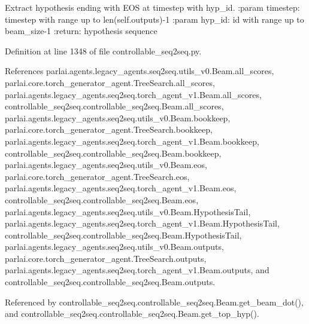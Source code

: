 \begin{DoxyVerb}Extract hypothesis ending with EOS at timestep with hyp_id.
:param timestep:
    timestep with range up to len(self.outputs)-1
:param hyp_id:
    id with range up to beam_size-1
:return:
    hypothesis sequence
\end{DoxyVerb}
 

Definition at line 1348 of file controllable\+\_\+seq2seq.\+py.



References parlai.\+agents.\+legacy\+\_\+agents.\+seq2seq.\+utils\+\_\+v0.\+Beam.\+all\+\_\+scores, parlai.\+core.\+torch\+\_\+generator\+\_\+agent.\+Tree\+Search.\+all\+\_\+scores, parlai.\+agents.\+legacy\+\_\+agents.\+seq2seq.\+torch\+\_\+agent\+\_\+v1.\+Beam.\+all\+\_\+scores, controllable\+\_\+seq2seq.\+controllable\+\_\+seq2seq.\+Beam.\+all\+\_\+scores, parlai.\+agents.\+legacy\+\_\+agents.\+seq2seq.\+utils\+\_\+v0.\+Beam.\+bookkeep, parlai.\+core.\+torch\+\_\+generator\+\_\+agent.\+Tree\+Search.\+bookkeep, parlai.\+agents.\+legacy\+\_\+agents.\+seq2seq.\+torch\+\_\+agent\+\_\+v1.\+Beam.\+bookkeep, controllable\+\_\+seq2seq.\+controllable\+\_\+seq2seq.\+Beam.\+bookkeep, parlai.\+agents.\+legacy\+\_\+agents.\+seq2seq.\+utils\+\_\+v0.\+Beam.\+eos, parlai.\+core.\+torch\+\_\+generator\+\_\+agent.\+Tree\+Search.\+eos, parlai.\+agents.\+legacy\+\_\+agents.\+seq2seq.\+torch\+\_\+agent\+\_\+v1.\+Beam.\+eos, controllable\+\_\+seq2seq.\+controllable\+\_\+seq2seq.\+Beam.\+eos, parlai.\+agents.\+legacy\+\_\+agents.\+seq2seq.\+utils\+\_\+v0.\+Beam.\+Hypothesis\+Tail, parlai.\+agents.\+legacy\+\_\+agents.\+seq2seq.\+torch\+\_\+agent\+\_\+v1.\+Beam.\+Hypothesis\+Tail, controllable\+\_\+seq2seq.\+controllable\+\_\+seq2seq.\+Beam.\+Hypothesis\+Tail, parlai.\+agents.\+legacy\+\_\+agents.\+seq2seq.\+utils\+\_\+v0.\+Beam.\+outputs, parlai.\+core.\+torch\+\_\+generator\+\_\+agent.\+Tree\+Search.\+outputs, parlai.\+agents.\+legacy\+\_\+agents.\+seq2seq.\+torch\+\_\+agent\+\_\+v1.\+Beam.\+outputs, and controllable\+\_\+seq2seq.\+controllable\+\_\+seq2seq.\+Beam.\+outputs.



Referenced by controllable\+\_\+seq2seq.\+controllable\+\_\+seq2seq.\+Beam.\+get\+\_\+beam\+\_\+dot(), and controllable\+\_\+seq2seq.\+controllable\+\_\+seq2seq.\+Beam.\+get\+\_\+top\+\_\+hyp().

